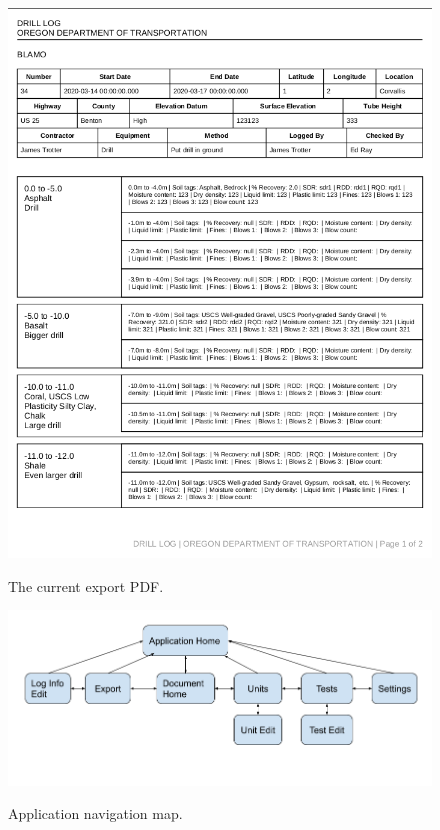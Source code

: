 \documentclass[onecolumn, draftclsnofoot,10pt, compsoc]{IEEEtran}
\begin{document}
\begin{figure}
    \includegraphics[scale=0.6]{Images/log1.png}
    \label{Fig 5.}
    \caption{ The current export PDF.}
\end{figure}
\begin{figure}
    \includegraphics[scale=0.6]{Images/Navigation Diagram.png}
    \label{Fig 8.}
    \caption{ Application navigation map.}
\end{figure}
\end{document}

